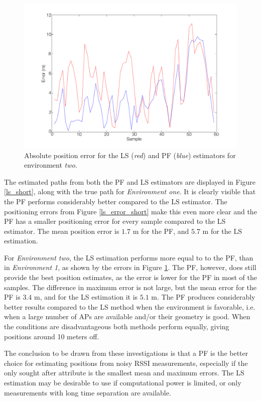 \documentclass{LTHthesis}
\begin{document}
%
\begin{figure}[!hbt]

\includegraphics[width=1\textwidth ]{images/pure_rssi/ls_error_medium}
\caption{Absolute position error for the LS (\emph{red}) and PF (\emph{blue}) estimators for environment \emph{two}.}\label{ls_error_medium}
\end{figure}

The estimated paths from both the PF and LS estimators are displayed in Figure \ref{ls_short}, along with the true path for \emph{Environment one}. It is clearly visible that the PF performs considerably better compared to the LS estimator. The positioning errors from Figure \ref{ls_error_short} make this even more clear and the PF has a smaller positioning error for every sample compared to the LS estimator. The mean position error is $1.7$ m for the PF, and $5.7$ m for the LS estimation.

For \emph{Environment two}, the LS estimation performs more equal to to the PF, than in \emph{Environment 1}, as shown by the errors in Figure \ref{ls_error_medium}. The PF, however, does still provide the best position estimates, as the error is lower for the PF in most of the samples. The difference in maximum error is not large, but the mean error for the PF is $3.4$ m, and for the LS estimation it is $5.1$ m. The PF produces considerably better results compared to the LS method when the environment is favorable, i.e. when a large number of APs are available and/or their geometry is good. When the conditions are disadvantageous both methods perform equally, giving positions around 10 meters off.

The conclusion to be drawn from these investigations is that a PF is the better choice for estimating positions from noisy RSSI measurements, especially if the only sought after attribute is the smallest mean and maximum errors. The LS estimation may be desirable to use if computational power is limited, or only measurements with long time separation are available.
\end{document}
